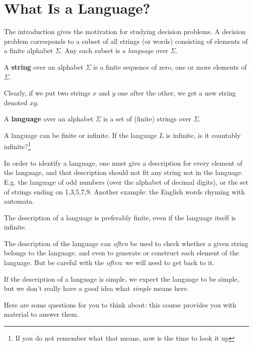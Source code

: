 \newpage
\section{What Is a Language?}

The introduction gives the motivation for studying decision
problems. A decision problem corresponds to a subset of all strings
(or words) consisting of elements of a finite alphabet $\Sigma$. Any
such subset is a {\em language} over $\Sigma$.

\begin{definition}
A {\bf string} over an alphabet $\Sigma$ is a finite sequence of zero,
one or more elements of $\Sigma$.
\end{definition}

Clearly, if we put two strings $x$ and $y$ one after the other, we get
a new string denoted $xy$.

\begin{definition}
A {\bf language} over an alphabet $\Sigma$ is a set of (finite)
strings over $\Sigma$.
\end{definition}

A language can be finite or infinite. If the language $L$ is infinite,
is it countably infinite?\footnote{If you do not remember what that
means, now is the time to look it up}

In order to identify a language, one must give a description for every
element of the language, and that description should not fit any
string not in the language. E.g. the language of odd numbers (over the
alphabet of decimal digits), or the set of strings ending on
1,3,5,7,9. Another example: the English words rhyming with automata.

The description of a language is preferably finite, even if the
language itself is infinite.

The description of the language can {\em often} be used to check whether a
given string belongs to the language, and even to generate or
construct each element of the language. But be careful with the {\em
often}: we will need to get back to it.

If the description of a language is simple, we expect the language to
be simple, but we don't really have a good idea what {\em simple}
means here.

Here are some questions for you to think about: this course provides
you with material to answer them.

